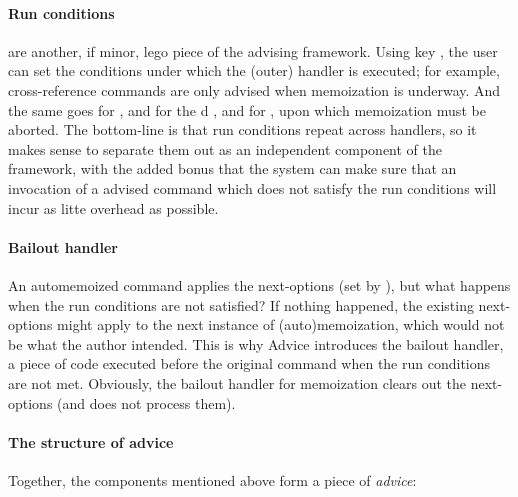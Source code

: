 \documentclass[a4paper,11pt]{article}
\begin{document}
\paragraph*{Run conditions} are another, if minor, lego piece of the
advising framework.  Using key , the user can set the
conditions under which the (outer) handler is executed; for example,
cross-reference commands are only advised when memoization is underway.  And
the same goes for , and for the d
, and for , upon which memoization must be
aborted.  The bottom-line is that run conditions repeat across handlers, so
it makes sense to separate them out as an independent component of the
framework, with the added bonus that the system can make sure that an
invocation of a advised command which does not satisfy the run conditions
will incur as litte overhead as possible.

\paragraph{Bailout handler}
An automemoized command applies the next-options (set by ), but
what happens when the run conditions are not satisfied?  If nothing happened,
the existing next-options might apply to the next instance of
(auto)memoization, which would not be what the author intended.  This is why
Advice introduces the bailout handler, a piece of code executed before the
original command when the run conditions are not met.  Obviously, the bailout
handler for memoization clears out the next-options (and does not process
them).

\paragraph{The structure of advice}
Together, the components mentioned above form a piece of \emph{advice}:
\end{document}
